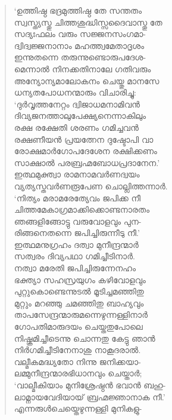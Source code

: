 \begin{verse}
‘ഉത്തിഷ്ഠ ഭദ്രമുത്തിഷ്ഠ തേ സന്തതം\\
സ്വസ്ത്യസ്തു ചിത്തശുദ്ധിസ്സദൈവാസ്തു തേ\\
സദ്യഃഫലം വരും സജ്ജനസംഗമാ-\\
ദ്വിദ്വജ്ജനാനാം മഹത്ത്വമേതാദൃശം\\
ഇന്നുതന്നെ തരുന്നുണ്ടൊരുപദേശ-\\
മെന്നാല്‍ നിനക്കതിനാലേ ഗതിവരും\\
അന്യോന്യമാലോകനം ചെയ്തു മാനസേ\\
ധന്യതപോധനന്മാരും വിചാരിച്ചു:\\
‘ദുര്‍വൃത്തനേറ്റം ദ്വിജാധമനാമിവന്‍\\
ദിവ്യജനത്താലുപേക്ഷ്യനെന്നാകിലും\\
രക്ഷ രക്ഷേതി ശരണം ഗമിച്ചവന്‍\\
രക്ഷണീയന്‍ പ്രയത്നേന ദുഷ്ടോപി വാ\\
രോക്ഷമാര്‍ഗോപദേശേന രക്ഷിക്കണം\\
സാക്ഷാല്‍ പരബ്രഹ്മബോധപ്രദാനേന.’\\
ഇത്ഥമുക്ത്വാ രാമനാമവര്‍ണദ്വയം\\
വ്യത്യസ്തവര്‍ണരൂപേണ ചൊല്ലിത്തന്നാര്‍.\\
‘നിത്യം മരാമരേത്യേവം ജപിക്ക നീ\\
ചിത്തമേകാഗ്രമാക്കിക്കൊണ്ടനാരതം\\
ഞങ്ങളിങ്ങോട്ടു വരുവോളവും പുന-\\
രിങ്ങനെതന്നെ ജപിച്ചിരുന്നീടു നീ.’\\
ഇത്ഥമനുഗ്രഹം ദത്വാ മുനീന്ദ്രന്മാര്‍\\
സത്വരം ദിവ്യപഥാ ഗമിച്ചീടിനാര്‍.\\
നത്വാ മരേതി ജപിച്ചിരുന്നേനഹം\\
ഭക്ത്യാ സഹസ്രയുഗം കഴിവോളവും\\
പുറ്റുകൊണ്ടെന്നുടല്‍ മൂടിച്ചമഞ്ഞിതു\\
മുറ്റും മറഞ്ഞു ചമഞ്ഞിതു ബാഹ്യവും\\
താപസേന്ദ്രന്മാരുമന്നെഴുന്നള്ളിനാര്‍\\
ഗോപതിമാരുദയം ചെയ്തതുപോലെ\\
നിഷ്ക്രമിച്ചീടെന്നു ചൊന്നതു കേട്ടു ഞാന്‍\\
നിര്‍ഗമിച്ചീടിനേനാശു നാകൂദരാല്‍.\\
വല്മീകമദ്ധ്യതോ നിന്നു ജനിക്കയാ-\\
ലമ്മുനീന്ദ്രന്മാരഭിധാനവും ചെയ്താര്‍;\\
‘വാല്മീകിയാം മുനിശ്രേഷ്ഠന്‍ ഭവാന്‍ ബഹു-\\
ലാമ്നായവേദിയായ് ബ്രഹ്മജ്ഞാനാക നീ.’\\
എന്നരുള്‍ചെയ്തെഴുന്നള്ളി മുനികളു-\\

\end{verse}
